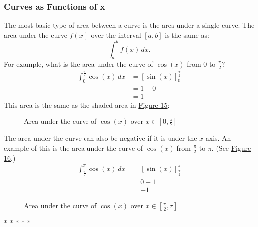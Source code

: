 \documentclass[12pt]{article}
\begin{document}
\subsubsection{Curves as Functions of x}
The most basic type of area between a curve is the area under a single curve. The area under the curve $f(x)$ over the interval $[a, b]$ is the same as:
\[ \int_a^b f(x) \, dx. \]
For example, what is the area under the curve of $\cos(x)$ from $0$ to $\frac{\pi}{2}$?
\begin{align*}
    \int_0^{\frac{\pi}{2}} \cos(x) \, dx & = \left[ \sin(x) \right]_0^{\frac{\pi}{2}} \\[6pt]
                                         & = 1 - 0                                    \\
                                         & = 1
\end{align*}
This area is the same as the shaded area in \hyperref[fig:auccosx1]{Figure 15}:

\begin{figure}[H]
    \begin{center}
        \caption{Area under the curve of $\cos(x)$ over $x \in [0, \frac{\pi}{2}]$}
        \label{fig:auccosx1}
    \end{center}
\end{figure}

The area under the curve can also be negative if it is under the $x$ axis. An example of this is the area under the curve of $\cos(x)$ from $\frac{\pi}{2}$ to $\pi$. (See \hyperref[fig:auccosx2]{Figure 16}.)
\begin{align*}
    \int_{\frac{\pi}{2}}^\pi \cos(x) \, dx & = \left[ \sin(x) \right]_{\frac{\pi}{2}}^\pi \\[6pt]
                                           & = 0 - 1                                      \\
                                           & = -1
\end{align*}

\begin{figure}[H]
    \begin{center}
        \caption{Area under the curve of $\cos(x)$ over $x \in [\frac{\pi}{2}, \pi]$}
        \label{fig:auccosx2}
    \end{center}
\end{figure}

\begin{center}
    * * * * *
\end{center}
\end{document}
